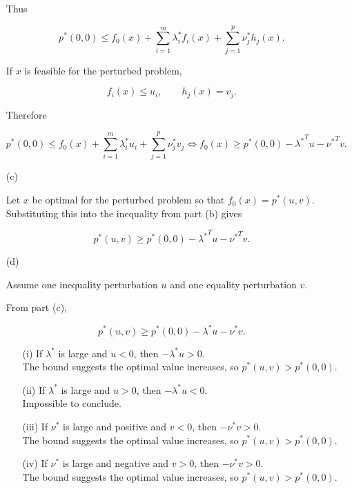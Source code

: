 \documentclass[
	12pt,
]{fphw}
\begin{document}
\begin{enumerate}
Thus

\[
p^*(0,0)
\le
f_0(x)
+
\sum_{i=1}^m \lambda_i^* f_i(x)
+
\sum_{j=1}^p \nu_j^* h_j(x).
\]

If \(x\) is feasible for the perturbed problem,

\[
f_i(x)\le u_i,\qquad h_j(x)=v_j.
\]

Therefore

\[
p^*(0,0)
\le
f_0(x)
+
\sum_{i=1}^m \lambda_i^* u_i
+
\sum_{j=1}^p \nu_j^* v_j 
\Leftrightarrow
f_0(x)
\ge
p^*(0,0)
-
{\lambda^*}^T u
-
{\nu^*}^T v .
\]

\item[(c)]

Let \(x\) be optimal for the perturbed problem so that
\(f_0(x)=p^*(u,v)\).
Substituting this into the inequality from part (b) gives

\[
p^*(u,v)
\ge
p^*(0,0)
-
{\lambda^*}^T u
-
{\nu^*}^T v .
\]

\item[(d)]

Assume one inequality perturbation \(u\) and one equality perturbation \(v\).

From part (c),

\[
p^*(u,v)
\ge
p^*(0,0)-\lambda^* u-\nu^* v .
\]

\begin{itemize}

\item[(i)]
If \(\lambda^*\) is large and \(u<0\), then
\(-\lambda^*u>0\).
\\The bound suggests the optimal value increases, so
\(p^*(u,v) > p^*(0,0)\).

\item[(ii)]
If \(\lambda^*\) is large and \(u>0\), then
\(-\lambda^*u<0\).
\\Impossible to conclude.


\item[(iii)]
If \(\nu^*\) is large and positive and \(v<0\), then
\(-\nu^*v>0\).
\\The bound suggests the optimal value increases,
so \(p^*(u,v) > p^*(0,0)\).

\item[(iv)]
If \(\nu^*\) is large and negative and \(v>0\), then
\(-\nu^*v>0\).
\\The bound suggests the optimal value increases,
so \(p^*(u,v) > p^*(0,0)\).

\end{itemize}

\end{enumerate}
\end{document}
